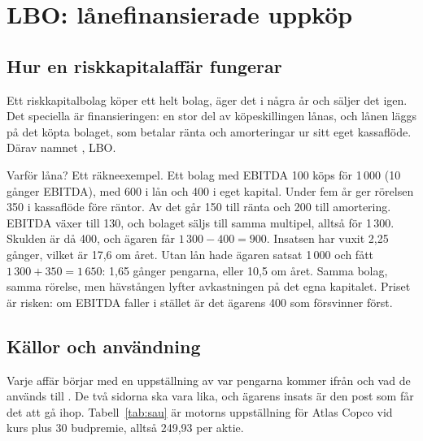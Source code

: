 \section{LBO: lånefinansierade uppköp}
\label{sec:lbo}

\subsection{Hur en riskkapitalaffär fungerar}

Ett riskkapitalbolag  köper ett helt bolag, äger
det i några år och säljer det igen. Det speciella är finansieringen: en stor del av köpeskillingen
lånas, och lånen läggs på det köpta bolaget, som betalar ränta och amorteringar ur sitt eget
kassaflöde. Därav namnet , LBO.

Varför låna? Ett räkneexempel. Ett bolag med EBITDA 100 köps för 1\,000 (10 gånger EBITDA),
med 600 i lån och 400 i eget kapital. Under fem år ger rörelsen 350 i kassaflöde före räntor.
Av det går 150 till ränta och 200 till amortering. EBITDA växer till 130, och bolaget säljs
till samma multipel, alltså för 1\,300. Skulden är då 400, och ägaren får $1\,300 - 400 = 900$.
Insatsen har vuxit 2,25 gånger, vilket är 17,6\pct{} om året. Utan lån hade ägaren satsat
1\,000 och fått $1\,300 + 350 = 1\,650$: 1,65 gånger pengarna, eller 10,5\pct{} om året. Samma
bolag, samma rörelse, men hävstången lyfter avkastningen på det egna kapitalet. Priset är
risken: om EBITDA faller i stället är det ägarens 400 som försvinner först.

\subsection{Källor och användning}

Varje affär börjar med en uppställning av var pengarna kommer ifrån och vad de används till
. De två sidorna ska vara lika, och ägarens insats är den post som får
det att gå ihop. Tabell~\ref{tab:sau} är motorns uppställning för Atlas Copco vid kurs plus
30\pct{} budpremie, alltså 249,93\kr{} per aktie.

